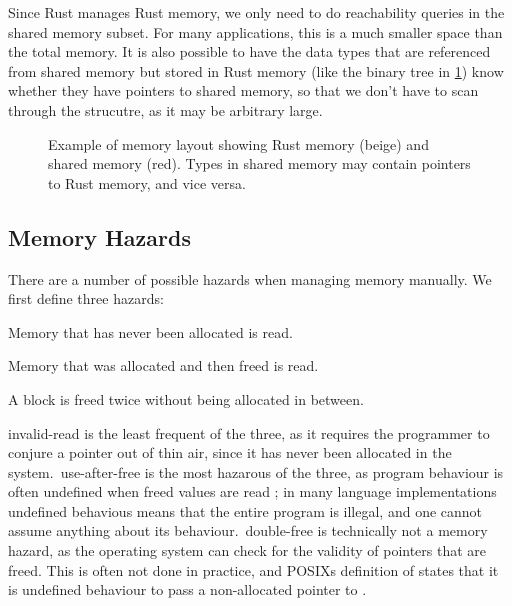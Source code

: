 Since Rust manages Rust memory, we only need to do reachability queries in the shared memory
subset. For many applications, this is a much smaller space than the total memory. It is also
possible to have the data types that are referenced from shared memory but stored in Rust memory
(like the binary tree in \cref{fig:rust-shared-mem}) know whether they have pointers to
shared memory, so that we don't have to scan through the strucutre, as it may be arbitrary large.


\begin{figure}
  \centering
  
  \caption{Example of memory layout showing Rust memory (beige) and shared memory (red). Types in
  shared memory may contain pointers to Rust memory, and vice versa.\label{fig:rust-shared-mem}}
\end{figure}

\subsection{Memory Hazards}

There are a number of possible hazards when managing memory manually. We first define three
hazards:

\begin{definition}
  Memory that has never been allocated is read.
\end{definition}

\begin{definition}
  Memory that was allocated and then freed is read.
\end{definition}

\begin{definition}
  A block is freed twice without being allocated in between.
\end{definition}

invalid-read is the least frequent of the three, as it requires the programmer to conjure a pointer
out of thin air, since it has never been allocated in the system.\ use-after-free is the most
hazarous of the three, as program behaviour is often undefined when freed values are read
; in many language implementations undefined behavious means that the
entire program is illegal, and one cannot assume anything about its behaviour.\ double-free is
technically not a memory hazard, as the operating system can check for the validity of pointers
that are freed. This is often not done in practice, and POSIXs definition of  states
that it is undefined behaviour to pass a non-allocated pointer to \cite{posix}.

